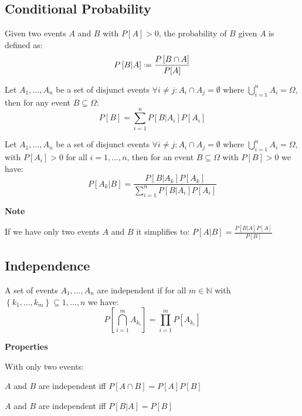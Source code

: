 \documentclass[8pt,a4paper]{extarticle}     %
\newcommand{\N}{\mathbb{N}}
\newcommand{\colnull}{\vfill\null\columnbreak}
\newcommand{\eqdef}{\mathrel{\vcenter{\baselineskip0.5ex\lineskiplimit0pt\hbox{\scriptsize.}\hbox{\scriptsize.}}}=}
\begin{document}
\begin{multicols}{4}
\subsection{Conditional Probability}
\begin{boxdefinition} 
	Given two events $A$ and $B$ with $P[A]>0$, the probability of $B$ given $A$ is defined as:
	\[
		P\left[B|A\right] \eqdef \frac{P\left[B\cap A\right]}{P[A]}
	\] 
\end{boxdefinition}
\begin{boxtheorem} 
	Let $A_1,\dots,A_n$ be a set of disjunct events $\forall i\neq j: A_i\cap A_j=\emptyset$ where $\bigcup_{i=1}^n A_i=\Omega$, then for any event $B\subseteq\Omega$:
	\[
		P\left[B\right] = \sum_{i=1}^{n} P\left[B|A_i\right]P\left[A_i\right]
	\]
\end{boxtheorem} 
\begin{boxtheorem} 
	Let $A_1,\dots,A_n$ be a set of disjunct events $\forall i\neq j: A_i\cap A_j=\emptyset$ where $\bigcup_{i=1}^n A_i=\Omega$, with $P[A_i]>0$ for all $i=1,\dots,n$, then for an event $B\subseteq\Omega$ with $P[B]>0$ we have: 
	\[
		P\left[A_k|B\right] = \frac{P[B|A_k]P[A_k]}{\sum_{i=1}^{n} P\left[B|A_i\right]P\left[A_i\right]}
	\]
\end{boxtheorem}
\begin{listb}
	\item [] \textbf{Note}
	\item If we have only two events $A$ and $B$ it simplifies to: $P[A|B] = \frac{P[B|A]P[A]}{P[B]}$
\end{listb}
\subsection{Independence}
\begin{boxdefinition}[Independence]	 
	A set of events $A_1,\dots,A_n$ are independent if for all $m\in\N$ with $\left\{k_1,\dots,k_m\right\}\subseteq{1,\dots,n}$ we have:
	\[
		P\left[\bigcap_{i=1}^m A_{k_i}\right] = \prod_{i=1}^m P[A_{k_i}]
	\]
\end{boxdefinition}
\begin{listb}
	\item [] \textbf{Properties}
	\item [] With only two events: 
	\item $A$ and $B$ are independent iff $P[A\cap B] = P[A]P[B]$
	\item $A$ and $B$ are independent iff $P[B|A] = P[B]$
\end{listb}
\colnull

\end{multicols}
\end{document}
